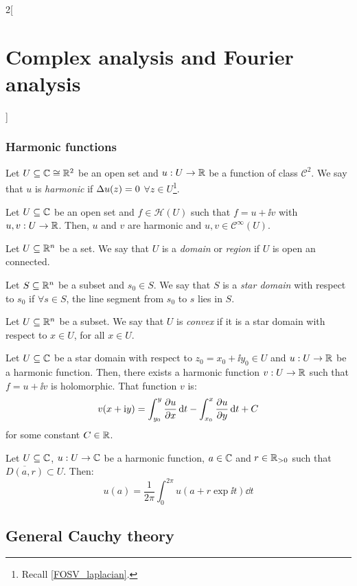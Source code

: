 \documentclass[../../../main.tex]{subfiles}
\begin{document}
\begin{multicols}{2}[\section{Complex analysis and Fourier analysis}]
  \subsubsection{Harmonic functions}
  \begin{definition}
    Let $U\subseteq \mathbb{C}\cong\mathbb{R}^2$ be an open set and $u:U\rightarrow \mathbb{R}$ be a function of class $\mathcal{C}^2$. We say that $u$ is \emph{harmonic} if $\Delta u(z)=0$ $\forall z\in U$\footnote{Recall \cref{FOSV_laplacian}.}.
  \end{definition}
  \begin{proposition}
    Let $U\subseteq \mathbb{C}$ be an open set and $f\in\mathcal{H}(U)$ such that $f=u+\ii v$ with $u,v:U\rightarrow\mathbb{R}$. Then, $u$ and $v$ are harmonic and $u,v\in\mathcal{C}^\infty(U)$.
  \end{proposition}
  \begin{definition}
    Let $U\subseteq\mathbb{R}^n$ be a set. We say that $U$ is a \emph{domain} or \emph{region} if $U$ is open an connected.
  \end{definition}
  \begin{definition}
    Let $S\subseteq\mathbb{R}^n$ be a subset and $s_0\in S$. We say that $S$ is a \emph{star domain} with respect to $s_0$ if $\forall s\in S$, the line segment from $s_0$ to $s$ lies in $S$.
  \end{definition}
  \begin{definition}
    Let $U\subseteq\mathbb{R}^n$ be a subset. We say that $U$ is \emph{convex} if it is a star domain with respect to $x\in U$, for all $x\in U$.
  \end{definition}
  \begin{proposition}
    Let $U\subseteq \mathbb{C}$ be a star domain with respect to $z_0=x_0+\ii y_0\in U$ and $u:U\rightarrow\mathbb{R}$ be a harmonic function. Then, there exists a harmonic function $v:U\rightarrow\mathbb{R}$ such that $f=u+\ii v$ is holomorphic. That function $v$ is:
    $$v(x+\mathrm{i} y)=\int_{y_0}^y\pdv{u}{x}(x+\mathrm{i} t)\dd{t}-\int_{x_0}^x\pdv{u}{y}(t+\mathrm{i} y_0)\dd{t}+C$$
    for some constant $C\in\mathbb{R}$.
  \end{proposition}
  \begin{theorem}
    Let $U\subseteq\mathbb{C}$, $u:U\rightarrow\mathbb{C}$ be a harmonic function, $a\in\mathbb{C}$ and $r\in\mathbb{R}_{>0}$ such that $\overline{D(a,r)}\subset U$. Then:
    $$u(a)=\frac{1}{2\pi}\int_0^{2\pi}u(a+r\exp{\ii t})\dd{t}$$
  \end{theorem}
  \subsection{General Cauchy theory}

\end{multicols}
\end{document}
